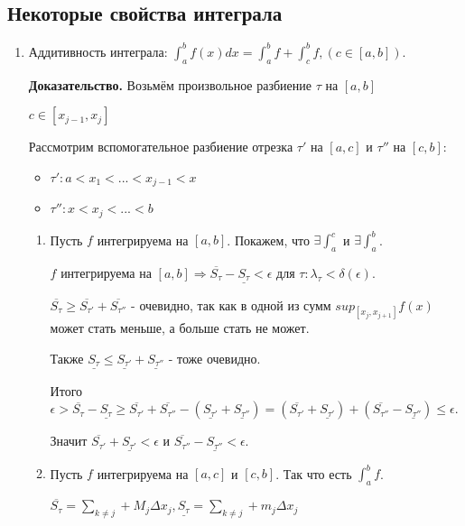 \documentclass[a4paper]{article}
\begin{document}
\subsection*{Некоторые свойства интеграла}

\begin{enumerate}
\item Аддитивность интеграла: 
$\displaystyle \int_a^b f(x)dx = \int_a^bf + \int_c^b f, (c \in [a,b])$.

\textbf{Доказательство.} Возьмём произвольное разбиение $\tau$ на $[a,b]$

$c \in [x_{j-1}, x_j]$

Рассмотрим вспомогательное разбиение отрезка $\tau'$ на $[a,c]$ и $\tau''$ на $[c,b]$:
\begin{itemize}
\item $\tau': a<x_1<...<x_{j-1}<x$
\item $\tau'': x<x_j<...<b$
\end{itemize}

\begin{enumerate}
\item Пусть $f$ интегрируема на $[a,b]$. Покажем, что $\exists \int_a^c$ и $\exists \int_a^b$.

$f$ интегрируема на $[a,b] \Rightarrow \overline{S_\tau} - \underline{S_\tau} < \epsilon$ для $\tau: \lambda_\tau < \delta(\epsilon)$.

$\overline{S_\tau} \geq \overline{S_{\tau'}} + \overline{S_{\tau''}}$ - очевидно, так как в одной из сумм $sup_[x_j, x_{j+1}] f(x)$ может стать меньше, а больше стать не может.

Также $\underline{S_\tau} \leq \underline{S_{\tau'}} + \underline{S_{\tau''}}$ - тоже очевидно.

Итого $\epsilon > \overline{S_\tau} - \underline{S_\tau} \geq \overline{S_{\tau'}} + \overline{S_{\tau''}} - (\underline{S_{\tau'}} + \underline{S_{\tau''}}) = (\overline{S_{\tau'}} + \underline{S_{\tau'}}) + (\overline{S_{\tau''}} - \underline{S_{\tau''}}) \leq \epsilon$.

Значит $ \overline{S_{\tau'}} + \underline{S_{\tau'}} < \epsilon$ и $\overline{S_{\tau''}} - \underline{S_{\tau''}} < \epsilon$.

\item Пусть $f$ интегрируема на $[a,c]$ и $[c,b]$. Так что есть $\int_a^b f$.

$\overline{S_\tau} = \sum_{k \neq j} + M_j \Delta x_j, \underline{S_\tau} = \sum_{k \neq j} + m_j \Delta x_j$


\end{enumerate}
\end{enumerate}
\end{document}
